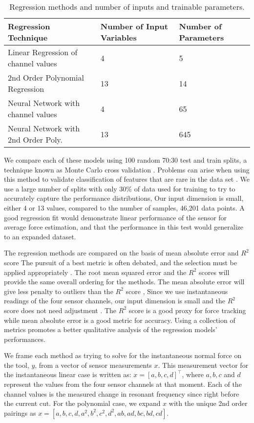 \begin{table}[h]
\centering
\caption{Regression methods and number of inputs and trainable parameters.}
\label{tab:methods}
\begin{tabular}{|l|l|l|}
\hline
Regression Technique & Number of Input Variables & Number of Parameters\\ \hline
Linear Regression of channel values & 4   & 5             \\ \hline
2nd Order Polynomial Regression     & 13  & 14            \\ \hline
Neural Network with channel values  & 4   & 65            \\ \hline
Neural Network with 2nd Order Poly. & 13  & 645           \\ \hline
\end{tabular}
\end{table}

We compare each of these models using 100 random 70:30 test and train splits, 
a technique known as Monte Carlo cross validation \cite{Girard1989}. 
Problems can arise when using this method to validate classification of features that are rare in the data set
\cite{Catania2022, Janze2017}.
We use a large number of splits with only 30\% of data used for training
to try to accurately capture the performance distributions,
Our input dimension is small, either 4 or 13 values, 
compared to the number of samples, 46,201 data points.
A good regression fit would demonstrate linear performance of the sensor for average force estimation, 
and that the performance in this test would generalize to an expanded dataset.

The regression methods are compared on the basis of
mean absolute error and $R^2$ score \cite{Lucke1984, Chicco2021, Leach2007}
The pursuit of a best metric is often debated, and the selection must be applied appropriately \cite{Tellinghuisen2011}.
The root mean squared error and the $R^2$ scores will provide the same overall ordering for the methods.
The mean absolute error will give less penalty to outliers than the $R^2$ score \cite{rozeboom1978estimation},
Since we use instantaneous readings of the four sensor channels, 
our input dimension is small and the $R^2$ score does not need adjustment \cite{Leach2007}. 
The $R^2$ score is a good proxy for force tracking while mean absolute error is a good metric for accuracy.
Using a collection of metrics promotes a better qualitative analysis of the regression models' performances.

We frame each method as trying to solve for 
the instantaneous normal force on the tool, $y$,
from a vector of sensor measurements $x$.
This measurement vector for the instantaneous linear case is written as:
$x = [a, b, c, d]^\top$, where $a,b,c$ and $d$ represent the values from the 
four sensor channels at that moment.
Each of the channel values is the measured change in resonant frequency since 
right before the current cut.
For the polynomial case, we expand $x$ with the unique 2nd order pairings as
 $x = [a, b, c, d, a^2, b^2, c^2, d^2, ab, ad, bc, bd, cd]$.

